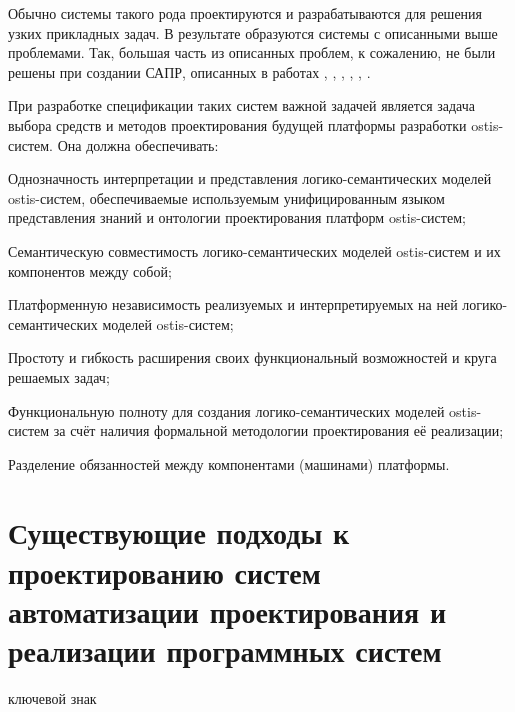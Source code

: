 Обычно системы такого рода проектируются и разрабатываются для решения узких прикладных задач. В результате образуются системы с описанными выше проблемами. Так, большая часть из описанных проблем, к сожалению, не были решены при создании САПР, описанных в работах \cite{lenat1990cyc}, \cite{reed2002mapping}, \cite{Gomolkaa2022}, \cite{Gribova2018}, \cite{Filippov2016}, \cite{Zagorulko2015}.

При разработке спецификации таких систем важной задачей является задача выбора средств и методов проектирования
будущей платформы разработки ostis-систем. Она должна обеспечивать:

\begin{textitemize}
    \item Однозначность интерпретации и представления логико-семантических моделей ostis-систем, обеспечиваемые используемым унифицированным языком представления знаний и онтологии проектирования платформ ostis-систем;
    \item Семантическую совместимость логико-семантических моделей ostis-систем и их компонентов между собой;
    \item Платформенную независимость реализуемых и интерпретируемых на ней логико-семантических моделей ostis-систем;
    \item Простоту и гибкость расширения своих функциональный возможностей и круга решаемых задач;
    \item Функциональную полноту для создания логико-семантических моделей ostis-систем за счёт наличия формальной методологии проектирования её реализации;
    \item Разделение обязанностей между компонентами (машинами) платформы.
\end{textitemize}

\section{Существующие подходы к проектированию систем автоматизации проектирования и реализации программных систем}
\label{sec_soft_platform_problems}

\begin{SCn}

\begin{scnrelfromlist}{ключевой знак}
\end{scnrelfromlist}

\end{SCn}

\bigskip

